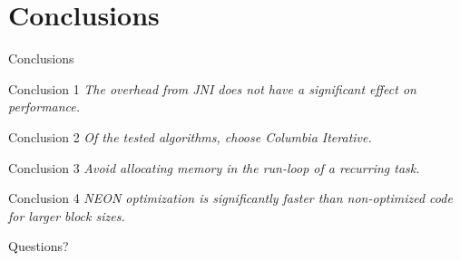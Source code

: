 \documentclass[xcolor={table}]{beamer}
\begin{document}
\section{Conclusions}
\begin{frame}{Conclusions}
    \begin{block}{Conclusion 1}
        \emph{The overhead from JNI does not have a significant effect on performance.}
    \end{block}
    \begin{block}{Conclusion 2}
        \emph{Of the tested algorithms, choose Columbia Iterative.}
    \end{block}
    \begin{block}{Conclusion 3}
        \emph{Avoid allocating memory in the run-loop of a recurring task.}
    \end{block}
    \begin{block}{Conclusion 4}
        \emph{NEON optimization is significantly faster than non-optimized code for larger block sizes.} %
    \end{block}
\end{frame}

\begin{frame}
    \Huge{\centerline{Questions?}}
\end{frame}
\end{document}
